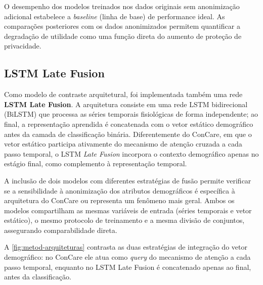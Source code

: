 O desempenho dos modelos treinados nos dados originais sem anonimização adicional estabelece a \textit{baseline} (linha de base) de performance ideal. As comparações posteriores com os dados anonimizados permitem quantificar a degradação de utilidade como uma função direta do aumento de proteção de privacidade.

\subsection{LSTM Late Fusion}
\label{subsec:metod-lstm}

Como modelo de contraste arquitetural, foi implementada também uma rede \textbf{LSTM Late Fusion}. A arquitetura consiste em uma rede LSTM bidirecional (BiLSTM) que processa as séries temporais fisiológicas de forma independente; ao final, a representação aprendida é concatenada com o vetor estático demográfico antes da camada de classificação binária. Diferentemente do ConCare, em que o vetor estático participa ativamente do mecanismo de atenção cruzada a cada passo temporal, o LSTM \textit{Late Fusion} incorpora o contexto demográfico apenas no estágio final, como complemento à representação temporal.

A inclusão de dois modelos com diferentes estratégias de fusão permite verificar se a sensibilidade à anonimização dos atributos demográficos é específica à arquitetura do ConCare ou representa um fenômeno mais geral. Ambos os modelos compartilham as mesmas variáveis de entrada (séries temporais e vetor estático), o mesmo protocolo de treinamento e a mesma divisão de conjuntos, assegurando comparabilidade direta.

A \autoref{fig:metod-arquiteturas} contrasta as duas estratégias de integração do vetor demográfico: no ConCare ele atua como \textit{query} do mecanismo de atenção a cada passo temporal, enquanto no LSTM Late Fusion é concatenado apenas ao final, antes da classificação.

